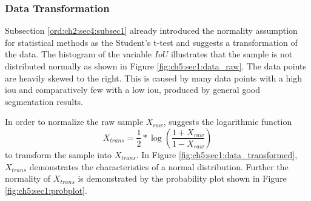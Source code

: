 \subsubsection{Data Transformation}
Subsection \ref{ord:ch2:sec4:subsec1} already introduced the normality assumption for statistical methods as the Student's t-test and suggests a transformation of the data.
The histogram of the variable $IoU$ illustrates that the sample is not distributed normally as shown in Figure \ref{fig:ch5:sec1:data_raw}.
The data points are heavily skewed to the right. 
This is caused by many data points with a high \gls{iou} and comparatively few with a low \gls{iou}, produced by general good segmentation results.

In order to normalize the raw sample $ X_{raw} $, \cite{PS16-Statistics} suggests the logarithmic function
\begin{equation} \label{equ:trans_iou}
	X_{trans} = \frac{1}{2} * \log \left( \frac{1 + X_{raw}}{1 - X_{raw}}\right) 
\end{equation}
to transform the sample into $ X_{trans} $.
In Figure \ref{fig:ch5:sec1:data_transformed}, $ X_{trans} $ demonstrates the characteristics of a normal distribution.
Further the normality of $ X_{trans} $ is demonstrated by the probability plot shown in Figure \ref{fig:ch5:sec1:probplot}.

